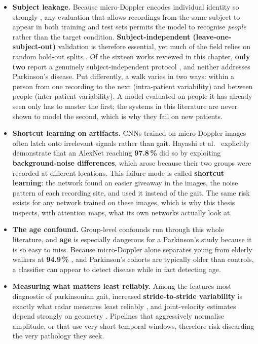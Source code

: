 \begin{itemize}
  \item \textbf{Subject leakage.} Because micro-Doppler encodes individual
        identity so strongly \cite{papanastasiou2020,ni2020}, any evaluation that
        allows recordings from the same subject to appear in both training and
        test sets permits the model to recognise \emph{people} rather than the
        target condition. \textbf{Subject-independent
        (leave-one-subject-out)} validation is therefore essential, yet much of
        the field relies on random hold-out splits
        \cite{hayashi2021,hoshiga2021}. Of the sixteen works reviewed in this
        chapter, \textbf{only two} report a genuinely subject-independent
        protocol \cite{fard2026,park2016}, and neither addresses Parkinson's
        disease. Put differently, a walk varies in two ways: within a person
        from one recording to the next (intra-patient variability) and
        between people (inter-patient variability). A model evaluated on
        people it has already seen only has to master the first; the systems
        in this literature are never shown to model the second, which is why
        they fail on new patients.

  \item \textbf{Shortcut learning on artifacts.} CNNs trained on micro-Doppler
        images often latch onto irrelevant signals rather than gait. Hayashi et al.\
        \cite{hayashi2021} explicitly demonstrate that an AlexNet reaching
        \textbf{97.8\,\%} did so by exploiting \textbf{background-noise
        differences}, which arose because their two groups were recorded at
        different locations. This failure mode is called \textbf{shortcut learning}: the network
        found an easier giveaway in the images, the noise pattern of each
        recording site, and used it instead of the gait. The same risk exists
        for any network trained on these images, which is why this thesis inspects, with
        attention maps, what its own networks actually look at.

  \item \textbf{The age confound.} Group-level confounds run through this whole literature, and
        \textbf{age} is especially dangerous for a Parkinson's study because
        it is so easy to miss. Because
        micro-Doppler alone separates young from elderly walkers at
        \textbf{94.9\,\%} \cite{hayashi2021}, and Parkinson's cohorts are
        typically older than controls, a classifier can appear to detect disease
        while in fact detecting age.

  \item \textbf{Measuring what matters least reliably.} Among the features
        most diagnostic of parkinsonian gait, increased
        \textbf{stride-to-stride variability} is exactly what radar measures
        least reliably \cite{gurbuz2024}, and joint-velocity estimates depend
        strongly on geometry \cite{seifert2020}. Pipelines
        that aggressively normalise amplitude, or that use very short temporal
        windows, therefore risk discarding the very pathology they seek.
\end{itemize}

